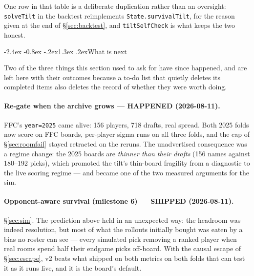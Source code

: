 \documentclass[10pt,a4paper]{article}
\makeatletter
\theoremstyle{plain}
\theoremstyle{definition}
\theoremstyle{remark}
\newcommand{\code}[1]{\texttt{\small #1}}
\renewcommand\section{\@startsection{section}{1}{\z@}%
  {-2.4ex \@plus -0.8ex \@minus -.2ex}{1.3ex \@plus.2ex}{\normalfont\Large\bfseries}}
\makeatother
\begin{document}
One row in that table is a deliberate duplication rather than an oversight:
\code{solveTilt} in the backtest reimplements \code{State.survivalTilt}, for the reason
given at the end of \S\ref{sec:backtest}, and \code{tiltSelfCheck} is what keeps the two
honest.

\section{What is next}

Two of the three things this section used to ask for have since happened, and are left
here with their outcomes because a to-do list that quietly deletes its completed items
also deletes the record of whether they were worth doing.

\paragraph{Re-gate when the archive grows --- HAPPENED (2026-08-11).} FFC's
\code{year=2025} came alive: 156 players, 718 drafts, real spread. Both 2025 folds now
score on FFC boards, per-player sigma runs on all three folds, and the cap of
\S\ref{sec:roomfail} stayed retracted on the reruns. The unadvertised consequence was a
regime change: the 2025 boards are \emph{thinner than their drafts} (156 names against
180--192 picks), which promoted the tilt's thin-board fragility from a diagnostic to the
live scoring regime --- and became one of the two measured arguments for the sim.

\paragraph{Opponent-aware survival (milestone 6) --- SHIPPED (2026-08-11).} \S\ref{sec:sim}.
The prediction above held in an unexpected way: the headroom was indeed resolution, but
most of what the rollouts initially bought was eaten by a bias no roster can see --- every
simulated pick removing a ranked player when real rooms spend half their endgame picks
off-board. With the causal escape of \S\ref{sec:escape}, v2 beats what shipped on both
metrics on both folds that can test it as it runs live, and it is the board's default.
\end{document}
